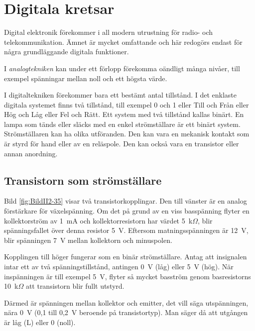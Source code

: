 \section{Digitala kretsar}
\label{digitala kretsar}

Digital elektronik förekommer i all modern utrustning för radio- och telekommunikation. 
Ämnet är mycket omfattande och här redogörs endast för några grundläggande digitala funktioner.

I \emph{analogtekniken} kan under ett förlopp förekomma oändligt många nivåer, till exempel spänningar mellan noll och ett högsta värde.

I digitaltekniken förekommer bara ett bestämt antal tillstånd. I det enklaste digitala systemet finns två tillstånd, till exempel 0 och 1 eller Till och Från eller Hög och Låg eller Fel och Rätt. 
Ett system med två tillstånd kallas binärt. En lampa som tänds eller släcks med en enkel strömställare är ett binärt system. Strömställaren kan ha olika utföranden. Den kan vara en mekanisk kontakt som är styrd för hand eller av en reläspole. Den kan också vara en transistor eller annan anordning.

\subsection{Transistorn som strömställare}


Bild \ref{fig:BildII2-35} visar två transistorkopplingar.
Den till vänster är en analog förstärkare för växelspänning.
Om det på grund av en viss basspänning flyter en kollektorström av
\SI{1}{\milli\ampere} och kollektorresistorn har värdet 5~k\(\Omega\), blir
spänningsfallet över denna resistor \SI{5}{\volt}.
Eftersom matningsspänningen är \SI{12}{\volt}, blir spänningen \SI{7}{\volt}
mellan kollektorn och minuspolen.

Kopplingen till höger fungerar som en binär strömställare.
Antag att insignalen intar ett av två spänningstillstånd, antingen
\SI{0}{\volt} (låg) eller \SI{5}{\volt} (hög).
När inspänningen är till exempel \SI{5}{\volt}, flyter så mycket basström genom
basresistorns 10~k\(\Omega\) att transistorn blir fullt utstyrd.

Därmed är spänningen mellan kollektor och emitter, det vill säga utspänningen,
nära \SI{0}{\volt} (0,1 till 0,2~V beroende på transistortyp).
Man säger då att utgången är låg (L) eller 0 (noll).

